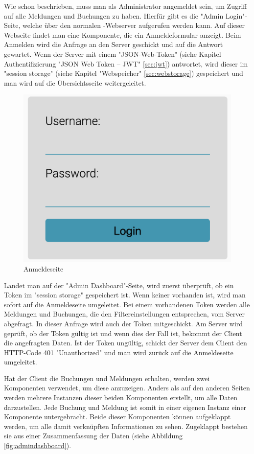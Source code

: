 Wie schon beschrieben, muss man als Administrator angemeldet sein, um Zugriff auf alle Meldungen und Buchungen zu haben. Hierfür gibt es die "Admin Login"-Seite, welche über den normalen \ZELIA-Webserver aufgerufen werden kann. Auf dieser Webseite findet man eine Komponente, die ein Anmeldeformular anzeigt. Beim Anmelden wird die Anfrage an den Server geschickt und auf die Antwort gewartet. Wenn der Server mit einem "JSON-Web-Token" (siehe Kapitel Authentifizierung "JSON Web Token -- JWT" \ref{sec:jwt}) antwortet, wird dieser im "session storage" (siehe Kapitel "Webspeicher" \ref{sec:webstorage}) gespeichert und man wird auf die Übersichtsseite weitergeleitet.

\begin{figure}[H]
    \centering
    \includegraphics[width=120mm]{media/WebComponents/Login_light.png}
    \caption{Anmeldeseite}
\end{figure}

Landet man auf der "Admin Dashboard"-Seite, wird zuerst überprüft, ob ein Token im "session storage" gespeichert ist. Wenn keiner vorhanden ist, wird man sofort auf die Anmeldeseite umgeleitet. Bei einem vorhandenen Token werden alle Meldungen und Buchungen, die den Filtereinstellungen entsprechen, vom Server abgefragt. In dieser Anfrage wird auch der Token mitgeschickt. Am Server wird geprüft, ob der Token gültig ist und wenn dies der Fall ist, bekommt der Client die angefragten Daten. Ist der Token ungültig, schickt der Server dem Client den HTTP-Code 401 "Unauthorized" und man wird zurück auf die Anmeldeseite umgeleitet.

Hat der Client die Buchungen und Meldungen erhalten, werden zwei Komponenten verwendet, um diese anzuzeigen. Anders als auf den anderen Seiten werden mehrere Instanzen dieser beiden Komponenten erstellt, um alle Daten darzustellen. Jede Buchung und Meldung ist somit in einer eigenen Instanz einer Komponente untergebracht. Beide dieser Komponenten können aufgeklappt werden, um alle damit verknüpften Informationen zu sehen. Zugeklappt bestehen sie aus einer Zusammenfassung der Daten (siehe Abbildung \ref{fig:admindashboard}).

